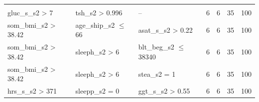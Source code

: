\documentclass[
  oneside]{book}
\begin{document}
\begin{table}[!h]
\begin{tabular}[t]{lllrrrr}
\addlinespace[0.3em]
\multicolumn{7}{l}{\textbf{Target class: C}}\\
\hspace{1em}gluc\_s\_s2 > 7 & tsh\_s2 > 0.996 & -- & 6 & 6 & 35 & 100\\
\hspace{1em}som\_bmi\_s2 > 38.42 & age\_ship\_s2 $\leq$ 66 & asat\_s\_s2 > 0.22 & 6 & 6 & 35 & 100\\
\hspace{1em}som\_bmi\_s2 > 38.42 & sleeph\_s2 > 6 & blt\_beg\_s2 $\leq$ 38340 & 6 & 6 & 35 & 100\\
\hspace{1em}som\_bmi\_s2 > 38.42 & sleeph\_s2 > 6 & stea\_s2 = 1 & 6 & 6 & 35 & 100\\
\hspace{1em}hrs\_s\_s2 > 371 & sleepp\_s2 = 0 & ggt\_s\_s2 > 0.55 & 6 & 6 & 35 & 100\\
\bottomrule
\end{tabular}
\end{table}
\end{document}
